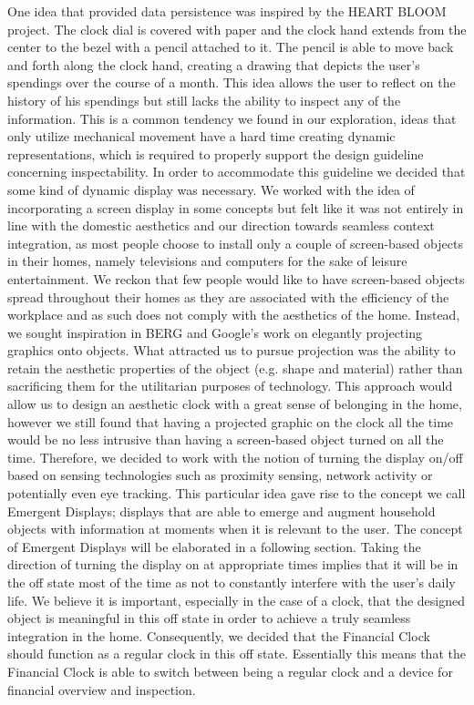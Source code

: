 One idea that provided data persistence was inspired by the HEART BLOOM project. The clock dial is covered with paper and the clock hand extends from the center to the bezel with a pencil attached to it. The pencil is able to move back and forth along the clock hand, creating a drawing that depicts the user’s spendings over the course of a month. This idea allows the user to reflect on the history of his spendings but still lacks the ability to inspect any of the information. This is a common tendency we found in our exploration, ideas that only utilize mechanical movement have a hard time creating dynamic representations, which is required to properly support the design guideline concerning inspectability. In order to accommodate this guideline we decided that some kind of dynamic display was necessary. We worked with the idea of incorporating a screen display in some concepts but felt like it was not entirely in line with the domestic aesthetics and our direction towards seamless context integration, as most people choose to install only a couple of screen-based objects in their homes, namely televisions and computers for the sake of leisure entertainment. We reckon that few people would like to have screen-based objects spread throughout their homes as they are associated with the efficiency of the workplace and as such does not comply with the aesthetics of the home. Instead, we sought inspiration in BERG and Google’s work on elegantly projecting graphics onto objects. What attracted us to pursue projection was the ability to retain the aesthetic properties of the object (e.g. shape and material) rather than sacrificing them for the utilitarian purposes of technology. This approach would allow us to design an aesthetic clock with a great sense of belonging in the home, however we still found that having a projected graphic on the clock all the time would be no less intrusive than having a screen-based object turned on all the time. Therefore, we decided to work with the notion of turning the display on/off based on sensing technologies such as proximity sensing, network activity or potentially even eye tracking. This particular idea gave rise to the concept we call Emergent Displays; displays that are able to emerge and augment household objects with information at moments when it is relevant to the user. The concept of Emergent Displays will be elaborated in a following section.
Taking the direction of turning the display on at appropriate times implies that it will be in the off state most of the time as not to constantly interfere with the user’s daily life. We believe it is important, especially in the case of a clock, that the designed object is meaningful in this off state in order to achieve a truly seamless integration in the home. Consequently, we decided that the Financial Clock should function as a regular clock in this off state. Essentially this means that the Financial Clock is able to switch between being a regular clock and a device for financial overview and inspection.

